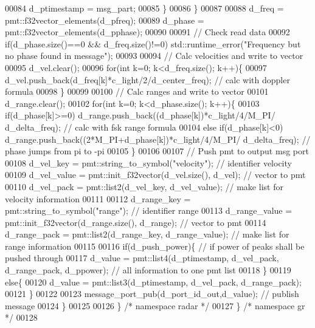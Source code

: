 \begin{DoxyCode}
00084                 d_ptimestamp = msg\_part;
00085             \}
00086         \}
00087         
00088         d_freq = pmt::f32vector\_elements(d_pfreq);
00089         d_phase = pmt::f32vector\_elements(d_pphase);
00090         
00091         \textcolor{comment}{// Check read data}
00092         \textcolor{keywordflow}{if}(d_phase.size()==0 && d_freq.size()!=0) std::runtime\_error(\textcolor{stringliteral}{"Frequency but no phase found in
       message"});
00093         
00094         \textcolor{comment}{// Calc velocities and write to vector}
00095         d_vel.clear();
00096         \textcolor{keywordflow}{for}(\textcolor{keywordtype}{int} k=0; k<d_freq.size(); k++)\{
00097             d_vel.push\_back(d_freq[k]*c_light/2/d_center_freq); \textcolor{comment}{// calc with doppler formula}
00098         \}
00099         
00100         \textcolor{comment}{// Calc ranges and write to vector}
00101         d_range.clear();
00102         \textcolor{keywordflow}{for}(\textcolor{keywordtype}{int} k=0; k<d_phase.size(); k++)\{
00103             \textcolor{keywordflow}{if}(d_phase[k]>=0) d_range.push\_back((d_phase[k])*c_light/4/M\_PI/
      d_delta_freq); \textcolor{comment}{// calc with fsk range formula}
00104             \textcolor{keywordflow}{else} \textcolor{keywordflow}{if}(d_phase[k]<0) d_range.push\_back((2*M\_PI+d_phase[k])*c_light/4/M\_PI/
      d_delta_freq); \textcolor{comment}{// phase jumps from pi to -pi}
00105         \}
00106         
00107         \textcolor{comment}{// Push pmt to output msg port}
00108         d_vel_key = pmt::string\_to\_symbol(\textcolor{stringliteral}{"velocity"}); \textcolor{comment}{// identifier velocity}
00109         d_vel_value = pmt::init\_f32vector(d_vel.size(), d_vel); \textcolor{comment}{// vector to pmt}
00110         d_vel_pack = pmt::list2(d_vel_key, d_vel_value); \textcolor{comment}{// make list for velocity information}
00111         
00112         d_range_key = pmt::string\_to\_symbol(\textcolor{stringliteral}{"range"}); \textcolor{comment}{// identifier range}
00113         d_range_value = pmt::init\_f32vector(d_range.size(), d_range); \textcolor{comment}{// vector to pmt}
00114         d_range_pack = pmt::list2(d_range_key, d_range_value); \textcolor{comment}{// make list for range information}
00115         
00116         \textcolor{keywordflow}{if}(d_push_power)\{ \textcolor{comment}{// if power of peaks shall be pushed through}
00117             d_value = pmt::list4(d_ptimestamp, d\_vel\_pack, d\_range\_pack, 
      d_ppower); \textcolor{comment}{// all information to one pmt list}
00118         \}
00119         \textcolor{keywordflow}{else}\{
00120             d_value = pmt::list3(d_ptimestamp, d\_vel\_pack, d\_range\_pack);
00121         \}
00122         
00123         message\_port\_pub(d_port_id_out,d_value); \textcolor{comment}{// publish message}
00124     \}
00125 
00126   \} \textcolor{comment}{/* namespace radar */}
00127 \} \textcolor{comment}{/* namespace gr */}
00128 
\end{DoxyCode}
